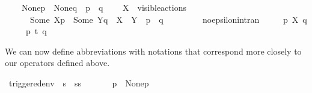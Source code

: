 \begin{isabellebody}
\ \ \ \ {\isacartoucheopen}{\isacharparenleft}{\kern0pt}{\isasymtheta}{\isacharquery}{\kern0pt}{\isacharbrackleft}{\kern0pt}None{\isacharbrackright}{\kern0pt}{\isacharparenleft}{\kern0pt}p{\isacharparenright}{\kern0pt}\ {\isacharequal}{\kern0pt}\ {\isasymtheta}{\isacharquery}{\kern0pt}{\isacharbrackleft}{\kern0pt}None{\isacharbrackright}{\kern0pt}{\isacharparenleft}{\kern0pt}q{\isacharparenright}{\kern0pt}{\isacharparenright}{\kern0pt}\ {\isasymlongrightarrow}\ p\ {\isacharequal}{\kern0pt}\ q{\isacartoucheclose}\isanewline
\ \ \ \ {\isacartoucheopen}X\ {\isasymsubseteq}\ visible{\isacharunderscore}{\kern0pt}actions\ {\isasymLongrightarrow}\ \isanewline
\ \ \ \ \ \ {\isacharparenleft}{\kern0pt}{\isasymtheta}{\isacharquery}{\kern0pt}{\isacharbrackleft}{\kern0pt}Some\ X{\isacharbrackright}{\kern0pt}{\isacharparenleft}{\kern0pt}p{\isacharparenright}{\kern0pt}\ {\isacharequal}{\kern0pt}\ {\isasymtheta}{\isacharquery}{\kern0pt}{\isacharbrackleft}{\kern0pt}Some\ Y{\isacharbrackright}{\kern0pt}{\isacharparenleft}{\kern0pt}q{\isacharparenright}{\kern0pt}{\isacharparenright}{\kern0pt}\ {\isasymlongrightarrow}\ X\ {\isacharequal}{\kern0pt}\ Y\ {\isasymand}\ p\ {\isacharequal}{\kern0pt}\ q{\isacartoucheclose}\isanewline
\ \ \ \ \isanewline
\isanewline
\ \ \ \ no{\isacharunderscore}{\kern0pt}epsilon{\isacharunderscore}{\kern0pt}in{\isacharunderscore}{\kern0pt}tran{\isacharcolon}{\kern0pt}\isanewline
\ \ \ \ {\isacartoucheopen}{\isasymnot}\ p\ {\isasymlongmapsto}{\isasymepsilon}{\isacharbrackleft}{\kern0pt}X{\isacharbrackright}{\kern0pt}\ q{\isacartoucheclose}\isanewline
\ \ \ \ {\isacartoucheopen}{\isasymnot}\ p\ {\isasymlongmapsto}t{\isacharunderscore}{\kern0pt}{\isasymepsilon}\ q{\isacartoucheclose}\isanewline
{}%
\begin{isamarkuptext}%
We can now define abbreviations with notations that correspond more closely to our operators defined above.%
\end{isamarkuptext}\isamarkuptrue%
\isamarkupfalse%
\ triggered{\isacharunderscore}{\kern0pt}env\ {\isacharcolon}{\kern0pt}{\isacharcolon}{\kern0pt}\ {\isacartoucheopen}{\isacharprime}{\kern0pt}s\ {\isasymRightarrow}\ {\isacharprime}{\kern0pt}ss{\isacartoucheclose}\ \isanewline
\ \ {\isacharparenleft}{\kern0pt}{\isacartoucheopen}{\isasymtheta}{\isacharprime}{\kern0pt}{\isacharparenleft}{\kern0pt}{\isacharunderscore}{\kern0pt}{\isacharprime}{\kern0pt}{\isacharparenright}{\kern0pt}{\isacartoucheclose}{\isacharparenright}{\kern0pt}\isanewline
\ \ \ {\isacartoucheopen}{\isasymtheta}{\isacharparenleft}{\kern0pt}p{\isacharparenright}{\kern0pt}\ {\isasymequiv}\ {\isasymtheta}{\isacharquery}{\kern0pt}{\isacharbrackleft}{\kern0pt}None{\isacharbrackright}{\kern0pt}{\isacharparenleft}{\kern0pt}p{\isacharparenright}{\kern0pt}{\isacartoucheclose}\isanewline

\end{isabellebody}

